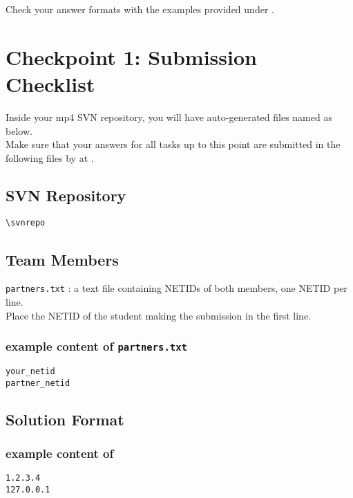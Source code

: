 Check your answer formats with the examples provided under \textit{}.

\newpage

\section*{Checkpoint 1: Submission Checklist}
\label{sec:cp1checklist}

Inside your mp4 SVN repository, you will have auto-generated files named as below.\\
Make sure that your answers for all tasks up to this point are submitted in the following files by \textbf{\checkpointduedate} at \textbf{\duetime}.

\subsection*{SVN Repository}
\nolinkurl{\svnrepo}

\subsection*{Team Members}
\texttt{partners.txt} : a text file containing NETIDs of both members, one NETID per line.\\
Place the NETID of the student making the submission in the first line.
\vspace{-12pt}
\hypertarget{cp1partners}{}
\subsubsection*{example content of \texttt{partners.txt}}
\begin{mdframed}
\begin{Verbatim}
your_netid
partner_netid
\end{Verbatim}
\end{mdframed}

\subsection*{Solution Format}

\hypertarget{ipformat}{}
\subsubsection*{example content of \texttt{\hyperlink{cp1macip}{\fileip}}}
\begin{mdframed}
\begin{Verbatim}
1.2.3.4
127.0.0.1
\end{Verbatim}
\end{mdframed}

